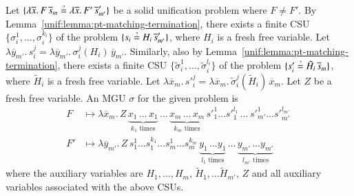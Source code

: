 \begin{lemma}
  \label{unif:lemma:solid-vars-diff-mgu}
  Let 
  $\{\lambda \overline{x}.\, F \, \overline{s}_m \unif \lambda\overline{x}.\, F' \, \overline{s}'_{m'}\}$
  be a solid unification problem
  where $F \neq F'$.
  By Lemma~\ref{unif:lemma:pt-matching-termination}, there exists a finite CSU $\{\sigma_i^1, \dots, \sigma_i^{k_i} \}$
  of the problem $\{s_i \unif H_i \, \overline{s}'_{m'}\}$, 
  where $H_i$ is a fresh free variable.
  Let 
  $\lambda\overline{y}_{m'}. \, s_i^j = \lambda\overline{y}_{m'}. \, \sigma_i^j(H_i) \,\overline{y}_{m'}$.
  Similarly, also by Lemma~\ref{unif:lemma:pt-matching-termination}, 
  there exists a finite CSU $\{ \tilde\sigma_i^1, \dots, \tilde\sigma_i^{l_i} \}$
  of the problem $\{s'_i \unif \tilde H_i \, \overline{s}_m\}$, where $\tilde H_i$
  is a fresh free variable. 
  Let 
  $\lambda \overline{x}_m. \, {s'}_i^j = \lambda \overline{x}_m. \, \tilde\sigma_i^j(\tilde H_i) \, \overline{x}_m$.
  Let $Z$ be a fresh free variable.
  An MGU $\sigma$ for the given problem is
  \pagebreak[2]
    \begin{align*} 
      F &\mapsto \lambda \overline{x}_m.\, Z
          \, \underbrace{x_1 \, \ldots \, x_1}_{k_1 \text{ times}} \, \ldots \,
             \underbrace{x_m \, \ldots \, x_m}_{k_m \text{ times}} 
             \, {s'}_1^1 \ldots {s'}_1^{l_1} \, \ldots \, {s'}_{m'}^1 \ldots {s'}_{m'}^{l_{m'}} \, \\
      F' &\mapsto \lambda \overline{y}_{m'}. \, Z
          \, s_1^1 \ldots s_1^{k_1} \ldots s_m^1 \ldots s_m^{k_m} \,
      \underbrace{y_1 \, \ldots y_1}_{l_1 \text{ times}} \, \ldots \,
      \underbrace{y_{m'} \, \ldots y_{m'}}_{l_{m'} \text{ times}}
    \end{align*}
  where the auxiliary variables are $H_1, \dots, H_m$, $\tilde H_1, \dots \tilde H_{m'}$, $Z$ and all auxiliary variables associated with the above CSUs.
\end{lemma}

